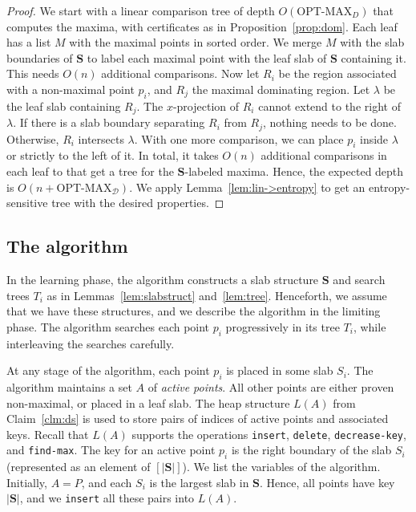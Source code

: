 \documentclass[letterpaper,11pt]{article}
\newcommand{\OPTMAX}{\text{OPT-MAX}}
\newcommand{\findmax}{\texttt{find-max}}
\newcommand{\ins}{\texttt{insert}}
\newcommand{\delete}{\texttt{delete}}
\newcommand{\deckey}{\texttt{decrease-key}}
\newcommand{\bS}{\textbf{S}}
\newcommand{\cD}{\mathcal{D}}
\begin{document}
\begin{proof} 
We start with a linear comparison 
tree of depth $O(\OPTMAX_D)$ that computes the maxima, with
certificates as in 
Proposition~\ref{prop:dom}. 
Each leaf has a list $M$ with the maximal
points in sorted order.  We merge $M$ with the 
slab boundaries of $\bS$ to label each 
maximal point with the leaf slab of $\bS$ containing it. 
This needs $O(n)$ additional comparisons.
Now let $R_i$ be the region associated 
with a non-maximal point $p_i$, and $R_j$ 
the maximal dominating region. Let $\lambda$ 
be the leaf slab containing $R_j$.
The $x$-projection of $R_i$ cannot extend 
to the right of $\lambda$.
If there is a slab boundary separating 
$R_i$ from $R_j$, nothing needs to be done.
Otherwise, $R_i$ intersects 
$\lambda$. With one more comparison, we can
place $p_i$ inside $\lambda$ or strictly 
to the left of it.
In total, it takes $O(n)$ additional 
comparisons in each leaf to
that get a tree for the $\bS$-labeled 
maxima. Hence, the expected depth is $O(n + \OPTMAX_\cD)$. 
We apply Lemma~\ref{lem:lin->entropy} 
to get an entropy-sensitive tree with
the desired properties.
\end{proof}

\subsection{The algorithm}
\label{sec:algorithm}

In the learning phase, the algorithm 
constructs a slab structure $\bS$ and
search trees $T_i$ as in 
Lemmas~\ref{lem:slabstruct} and~\ref{lem:tree}.
Henceforth, we assume that we have these structures, 
and we describe the algorithm in the limiting
phase.
The algorithm searches
each point $p_i$ progressively 
in its tree $T_i$, while
interleaving
the searches carefully. 

At any stage of the algorithm, 
each point $p_i$ is placed in some slab 
$S_i$.  The algorithm maintains a set 
$A$ of \emph{active points}. All
other points are either proven 
non-maximal, or placed in 
a leaf slab. 
The heap structure $L(A)$ from
Claim~\ref{clm:ds} is used to
store pairs of indices of active points
and associated keys.
Recall that $L(A)$ supports the operations \ins{},
\delete{}, \deckey{}, and \findmax{}. The key 
for an active point $p_i$ is the  
right boundary of the slab $S_i$ 
(represented as an element of $[|\bS|]$).
We list the variables of the algorithm.
Initially, $A = P$, and each $S_i$ is the largest 
slab in $\bS$.  Hence, all points have  key $|\bS|$, 
and we \ins{} all these pairs
into $L(A)$. 
\end{document}
